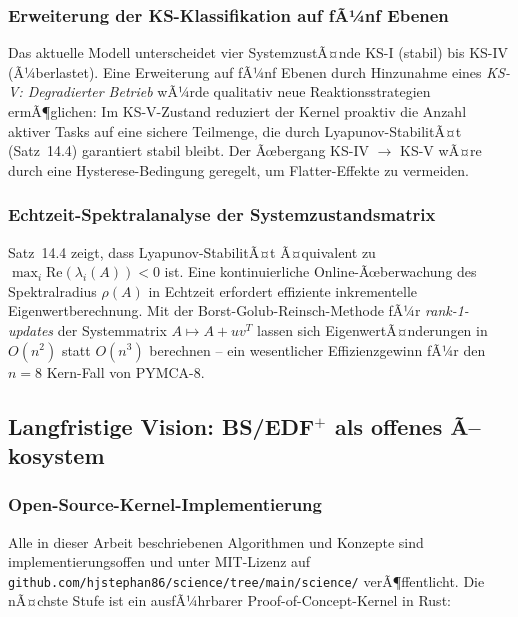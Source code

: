 ﻿\documentclass[a4paper,12pt]{scrreprt}
\theoremstyle{definition}
\begin{document}
	\subsubsection{Erweiterung der KS-Klassifikation auf fÃ¼nf Ebenen}
	
	Das aktuelle Modell \cite{Epp2026sysstate} unterscheidet vier
	SystemzustÃ¤nde KS-I (stabil) bis KS-IV (Ã¼berlastet). Eine Erweiterung
	auf fÃ¼nf Ebenen durch Hinzunahme eines \emph{KS-V: Degradierter
		Betrieb} wÃ¼rde qualitativ neue Reaktionsstrategien ermÃ¶glichen:
	Im KS-V-Zustand reduziert der Kernel proaktiv die Anzahl aktiver
	Tasks auf eine sichere Teilmenge, die durch Lyapunov-StabilitÃ¤t
	(Satz~14.4) garantiert stabil bleibt. Der Ãœbergang KS-IV $\to$
	KS-V wÃ¤re durch eine Hysterese-Bedingung geregelt, um Flatter-Effekte
	zu vermeiden.
	
	\subsubsection{Echtzeit-Spektralanalyse der Systemzustands\-matrix}
	
	Satz~14.4 zeigt, dass Lyapunov-StabilitÃ¤t Ã¤quivalent zu
	$\max_i \mathrm{Re}(\lambda_i(A)) < 0$ ist. Eine kontinuierliche
	Online-Ãœberwachung des Spektralradius $\rho(A)$ in Echtzeit erfordert
	effiziente inkrementelle Eigenwertberechnung. Mit der
	Borst-Golub-Reinsch-Methode fÃ¼r \emph{rank-1-updates} der
	Systemmatrix $A \mapsto A + uv^T$ lassen sich
	EigenwertÃ¤nderungen in $O(n^2)$ statt $O(n^3)$ berechnen --
	ein wesentlicher Effizienzgewinn fÃ¼r den $n = 8$ Kern-Fall
	von PYMCA-8.
	
	\subsection{Langfristige Vision: BS/EDF\texorpdfstring{$^+$}{+} als offenes Ã–kosystem}
	
	\subsubsection{Open-Source-Kernel-Implementierung}
	
	Alle in dieser Arbeit beschriebenen Algorithmen und Konzepte sind
	implementierungsoffen und unter MIT-Lizenz auf
	\texttt{github.com/hjstephan86/science/tree/main/science/} verÃ¶ffentlicht. Die nÃ¤chste Stufe
	ist ein ausfÃ¼hrbarer Proof-of-Concept-Kernel in Rust:
	
\end{document}
